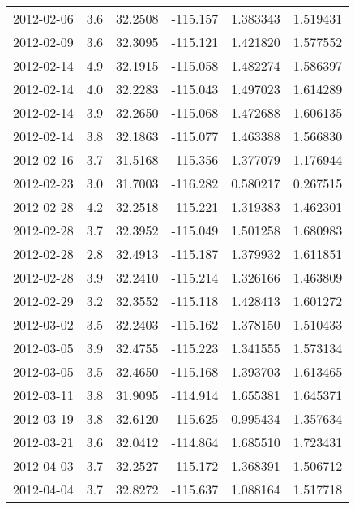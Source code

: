 \begin{tabular}{lrrrrr}
2012-02-06 &       3.6 &  32.2508 &  -115.157 &         1.383343 &         1.519431 \\
2012-02-09 &       3.6 &  32.3095 &  -115.121 &         1.421820 &         1.577552 \\
2012-02-14 &       4.9 &  32.1915 &  -115.058 &         1.482274 &         1.586397 \\
2012-02-14 &       4.0 &  32.2283 &  -115.043 &         1.497023 &         1.614289 \\
2012-02-14 &       3.9 &  32.2650 &  -115.068 &         1.472688 &         1.606135 \\
2012-02-14 &       3.8 &  32.1863 &  -115.077 &         1.463388 &         1.566830 \\
2012-02-16 &       3.7 &  31.5168 &  -115.356 &         1.377079 &         1.176944 \\
2012-02-23 &       3.0 &  31.7003 &  -116.282 &         0.580217 &         0.267515 \\
2012-02-28 &       4.2 &  32.2518 &  -115.221 &         1.319383 &         1.462301 \\
2012-02-28 &       3.7 &  32.3952 &  -115.049 &         1.501258 &         1.680983 \\
2012-02-28 &       2.8 &  32.4913 &  -115.187 &         1.379932 &         1.611851 \\
2012-02-28 &       3.9 &  32.2410 &  -115.214 &         1.326166 &         1.463809 \\
2012-02-29 &       3.2 &  32.3552 &  -115.118 &         1.428413 &         1.601272 \\
2012-03-02 &       3.5 &  32.2403 &  -115.162 &         1.378150 &         1.510433 \\
2012-03-05 &       3.9 &  32.4755 &  -115.223 &         1.341555 &         1.573134 \\
2012-03-05 &       3.5 &  32.4650 &  -115.168 &         1.393703 &         1.613465 \\
2012-03-11 &       3.8 &  31.9095 &  -114.914 &         1.655381 &         1.645371 \\
2012-03-19 &       3.8 &  32.6120 &  -115.625 &         0.995434 &         1.357634 \\
2012-03-21 &       3.6 &  32.0412 &  -114.864 &         1.685510 &         1.723431 \\
2012-04-03 &       3.7 &  32.2527 &  -115.172 &         1.368391 &         1.506712 \\
2012-04-04 &       3.7 &  32.8272 &  -115.637 &         1.088164 &         1.517718 \\

\end{tabular}
